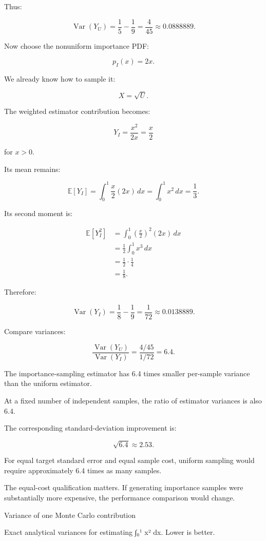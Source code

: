 Thus:

\[
 \operatorname{Var}(Y_U) = \frac15-\frac19 = \boxed{\frac4{45}} \approx0.0888889.
\]

Now choose the nonuniform importance PDF:

\[
 p_I(x)=2x.
\]

We already know how to sample it:

\[
 X=\sqrt U.
\]

The weighted estimator contribution becomes:

\[
 Y_I= \frac{x^2}{2x} =\frac x2
\]

for \(x>0\).

Its mean remains:

\[
 \mathbb E[Y_I] = \int_0^1\frac x2(2x)\,dx = \int_0^1x^2\,dx =\frac13.
\]

Its second moment is:

\[
 \begin{aligned} \mathbb E[Y_I^2] &= \int_0^1\left(\frac x2\right)^2(2x)\,dx\\ &= \frac12\int_0^1x^3\,dx\\ &=\frac12\cdot\frac14\\ &=\frac18. \end{aligned}
\]

Therefore:

\[
 \operatorname{Var}(Y_I) = \frac18-\frac19 = \boxed{\frac1{72}} \approx0.0138889.
\]

Compare variances:

\[
 \boxed{ \frac{\operatorname{Var}(Y_U)} {\operatorname{Var}(Y_I)} = \frac{4/45}{1/72} =6.4 }.
\]

The importance-sampling estimator has 6.4 times smaller per-sample variance than the uniform estimator.

At a fixed number of independent samples, the ratio of estimator variances is also 6.4.

The corresponding standard-deviation improvement is:

\[
 \sqrt{6.4}\approx2.53.
\]

For equal target standard error and equal sample cost, uniform sampling would require approximately 6.4 times as many samples.

The equal-cost qualification matters. If generating importance samples were substantially more expensive, the performance comparison would change.

Variance of one Monte Carlo contribution

Exact analytical variances for estimating ∫₀¹ x² dx. Lower is better.

